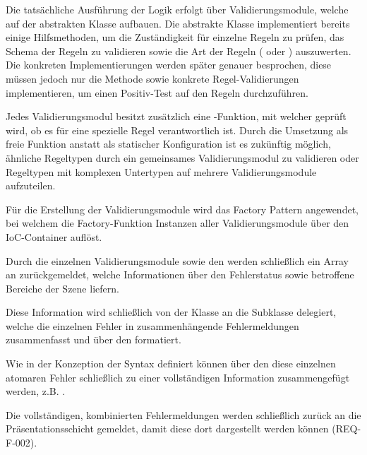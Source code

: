\medskip

Die tatsächliche Ausführung der Logik erfolgt über Validierungsmodule, welche auf der abstrakten Klasse  aufbauen. Die abstrakte Klasse implementiert bereits einige Hilfsmethoden, um die Zuständigkeit für einzelne Regeln zu prüfen, das Schema der Regeln zu validieren sowie die Art der Regeln ( oder ) auszuwerten. Die konkreten Implementierungen werden später genauer besprochen, diese müssen jedoch nur die Methode  sowie konkrete Regel-Validierungen implementieren, um einen Positiv-Test auf den Regeln durchzuführen.

Jedes Validierungsmodul besitzt zusätzlich eine -Funktion, mit welcher geprüft wird, ob es für eine spezielle Regel verantwortlich ist. Durch die Umsetzung als freie Funktion anstatt als statischer Konfiguration ist es zukünftig möglich, ähnliche Regeltypen durch ein gemeinsames Validierungsmodul zu validieren oder Regeltypen mit komplexen Untertypen auf mehrere Validierungsmodule aufzuteilen.

Für die Erstellung der Validierungsmodule wird das Factory Pattern angewendet, bei welchem die Factory-Funktion  Instanzen aller Validierungsmodule über den IoC-Container auflöst.

\medskip

Durch die einzelnen Validierungsmodule sowie den  werden schließlich ein Array an  zurückgemeldet, welche Informationen über den Fehlerstatus sowie betroffene Bereiche der Szene liefern.

Diese Information wird schließlich von der Klasse  an die Subklasse  delegiert, welche die einzelnen Fehler in zusammenhängende Fehlermeldungen zusammenfasst und über den  formatiert.

\medskip

Wie in der Konzeption der Syntax definiert können über den  diese einzelnen atomaren Fehler schließlich zu einer vollständigen Information zusammengefügt werden, z.B. .

Die vollständigen, kombinierten Fehlermeldungen werden schließlich zurück an die Präsentationsschicht gemeldet, damit diese dort dargestellt werden können (REQ-F-002).

